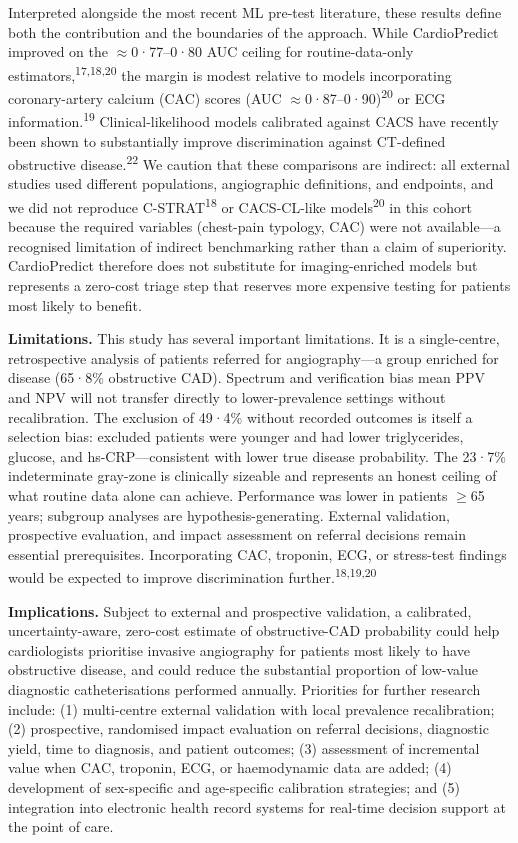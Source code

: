 \documentclass[english,11pt]{article}
\begin{document}
Interpreted alongside the most recent ML pre-test literature, these results define both the contribution and the boundaries of the approach. While CardioPredict improved on the $\approx$0·77--0·80 AUC ceiling for routine-data-only estimators,\textsuperscript{17,18,20} the margin is modest relative to models incorporating coronary-artery calcium (CAC) scores (AUC $\approx$0·87--0·90)\textsuperscript{20} or ECG information.\textsuperscript{19} Clinical-likelihood models calibrated against CACS have recently been shown to substantially improve discrimination against CT-defined obstructive disease.\textsuperscript{22} We caution that these comparisons are indirect: all external studies used different populations, angiographic definitions, and endpoints, and we did not reproduce C-STRAT\textsuperscript{18} or CACS-CL-like models\textsuperscript{20} in this cohort because the required variables (chest-pain typology, CAC) were not available---a recognised limitation of indirect benchmarking rather than a claim of superiority. CardioPredict therefore does not substitute for imaging-enriched models but represents a zero-cost triage step that reserves more expensive testing for patients most likely to benefit.

\textbf{Limitations.}
This study has several important limitations. It is a single-centre, retrospective analysis of patients referred for angiography---a group enriched for disease (65·8\% obstructive CAD). Spectrum and verification bias mean PPV and NPV will not transfer directly to lower-prevalence settings without recalibration. The exclusion of 49·4\% without recorded outcomes is itself a selection bias: excluded patients were younger and had lower triglycerides, glucose, and hs-CRP---consistent with lower true disease probability. The 23·7\% indeterminate gray-zone is clinically sizeable and represents an honest ceiling of what routine data alone can achieve. Performance was lower in patients $\geq$65 years; subgroup analyses are hypothesis-generating. External validation, prospective evaluation, and impact assessment on referral decisions remain essential prerequisites. Incorporating CAC, troponin, ECG, or stress-test findings would be expected to improve discrimination further.\textsuperscript{18,19,20}

\textbf{Implications.}
Subject to external and prospective validation, a calibrated, uncertainty-aware, zero-cost estimate of obstructive-CAD probability could help cardiologists prioritise invasive angiography for patients most likely to have obstructive disease, and could reduce the substantial proportion of low-value diagnostic catheterisations performed annually. Priorities for further research include: (1) multi-centre external validation with local prevalence recalibration; (2) prospective, randomised impact evaluation on referral decisions, diagnostic yield, time to diagnosis, and patient outcomes; (3) assessment of incremental value when CAC, troponin, ECG, or haemodynamic data are added; (4) development of sex-specific and age-specific calibration strategies; and (5) integration into electronic health record systems for real-time decision support at the point of care.
\end{document}
